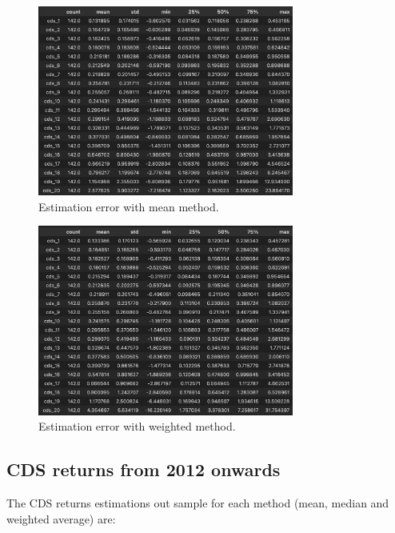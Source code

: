 \documentclass{article}
\begin{document}
\begin{Data science tools for finance final project}
\begin{figure}[H]
    \centering
    \includegraphics[width=0.75\textwidth]{../assets/Return difference_mean method.png}
    \caption{\label{fig:myplot}Estimation error with mean method.}
    \end{figure}   

\begin{figure}[H]
    \centering
    \includegraphics[width=0.75\textwidth]{../assets/Return difference_weighted method.png}
    \caption{\label{fig:myplot}Estimation error with weighted method.}
    \end{figure} 



\subsection*{CDS returns from 2012 onwards}

The CDS returns estimations out sample for each method (mean, median and weighted average) are:


\end{Data science tools for finance final project}
\end{document}
